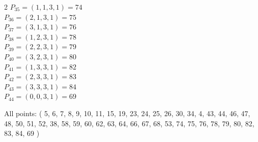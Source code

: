 \begin{multicols}{2}
$P_{35} = ( 1, 1, 3, 1 )=74$\\
$P_{36} = ( 2, 1, 3, 1 )=75$\\
$P_{37} = ( 3, 1, 3, 1 )=76$\\
$P_{38} = ( 1, 2, 3, 1 )=78$\\
$P_{39} = ( 2, 2, 3, 1 )=79$\\
$P_{40} = ( 3, 2, 3, 1 )=80$\\
$P_{41} = ( 1, 3, 3, 1 )=82$\\
$P_{42} = ( 2, 3, 3, 1 )=83$\\
$P_{43} = ( 3, 3, 3, 1 )=84$\\
$P_{44} = ( 0, 0, 3, 1 )=69$\\
\end{multicols}
All points: ( 5, 6, 7, 8, 9, 10, 11, 15, 19, 23, 24, 25, 26, 30, 34, 4, 43, 44, 46, 47, 48, 50, 51, 52, 38, 58, 59, 60, 62, 63, 64, 66, 67, 68, 53, 74, 75, 76, 78, 79, 80, 82, 83, 84, 69 )\\
